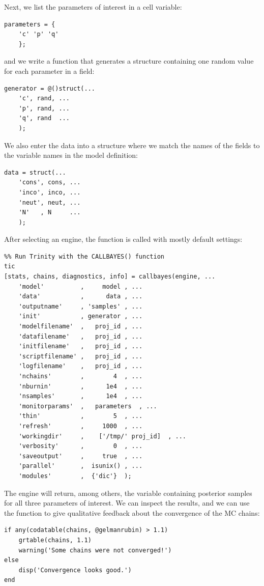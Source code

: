Next, we list the parameters of interest in a cell variable:
\begin{lstlisting}
parameters = {
    'c' 'p' 'q'
    };
\end{lstlisting}
\noindent and we write a function that generates a structure containing one random value for each parameter in a field:
\begin{lstlisting}
generator = @()struct(...
    'c', rand, ...
    'p', rand, ...
    'q', rand  ...
    );
\end{lstlisting}
We also enter the data into a structure where we match the names of the fields to the variable names in the model definition:
\begin{lstlisting}
data = struct(...
    'cons', cons, ...
    'inco', inco, ...
    'neut', neut, ...
    'N'   , N     ...
    );
\end{lstlisting}
After selecting an engine, the  function is called with mostly default settings:
\begin{lstlisting}
%% Run Trinity with the CALLBAYES() function
tic
[stats, chains, diagnostics, info] = callbayes(engine, ...
    'model'          ,     model , ...
    'data'           ,      data , ...
    'outputname'     , 'samples' , ...
    'init'           , generator , ...
    'modelfilename'  ,   proj_id , ...
    'datafilename'   ,   proj_id , ...
    'initfilename'   ,   proj_id , ...
    'scriptfilename' ,   proj_id , ...
    'logfilename'    ,   proj_id , ...
    'nchains'        ,        4  , ...
    'nburnin'        ,      1e4  , ...
    'nsamples'       ,      1e4  , ...
    'monitorparams'  ,   parameters  , ...
    'thin'           ,        5  , ...
    'refresh'        ,     1000  , ...
    'workingdir'     ,    ['/tmp/' proj_id]  , ...
    'verbosity'      ,        0  , ...
    'saveoutput'     ,     true  , ...
    'parallel'       ,  isunix() , ...
    'modules'        ,  {'dic'}  );
\end{lstlisting}

The engine will return, among others, the  variable containing posterior samples for all three parameters of interest. We can inspect the results, and we can use the  function to give qualitative feedback about the convergence of the MC chains:  
\begin{lstlisting}
if any(codatable(chains, @gelmanrubin) > 1.1)
    grtable(chains, 1.1)
    warning('Some chains were not converged!')
else
    disp('Convergence looks good.')
end
\end{lstlisting}

